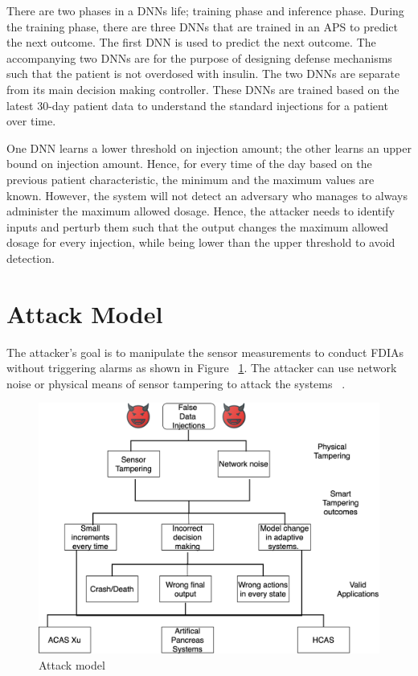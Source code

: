There are two phases in a \ac{DNN}s life; training phase and inference phase. 
During the training phase, there are three \ac{DNN}s that are trained in an \ac{APS} to predict the next outcome. 
The first \ac{DNN} is used to predict the next outcome. 
The accompanying two \ac{DNN}s are for the purpose of designing defense mechanisms such that the patient is not overdosed with insulin.  
The two \ac{DNN}s are separate from its main decision making controller. 
These \ac{DNN}s are trained based on the latest 30-day patient data to understand the standard injections for a patient over time. 

One \ac{DNN} learns a lower threshold on injection amount; the other learns an upper bound on injection amount. 
Hence, for every time of the day based on the previous patient characteristic, the minimum and the maximum values are known. 
However, the system will not detect  an adversary  who manages to always administer the maximum allowed dosage. 
Hence, the attacker needs to identify inputs and  perturb them  such that the output changes the maximum allowed dosage for every injection,
  while being lower than the upper threshold to avoid detection. 


\section{Attack Model}
The attacker's goal is to manipulate the sensor measurements to conduct FDIAs without triggering alarms as shown in Figure ~\ref{fig:attackmodelphysical}. 
The attacker can use network noise or physical means of sensor tampering to attack the systems ~\cite{10.1145/3319535.3339815}.
 
\begin{figure}
	\centering
	\includegraphics[width=0.7\linewidth]{Images/Attackmodelphysical}
	\caption{Attack model}
	\label{fig:attackmodelphysical}
\end{figure}

